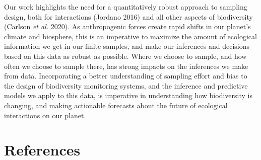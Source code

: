 \documentclass[10pt,oneside]{article}
\begin{document}
Our work highlights the need for a quantitatively robust approach to
sampling design, both for interactions (Jordano 2016) and all other
aspects of biodiversity (Carlson \emph{et al.} 2020). As anthropogenic
forces create rapid shifts in our planet's climate and biosphere, this
is an imperative to maximize the amount of ecological information we get
in our finite samples, and make our inferences and decisions based on
this data as robust as possible. Where we choose to sample, and how
often we choose to sample there, has strong impacts on the inferences we
make from data. Incorporating a better understanding of sampling effort
and bias to the design of biodiversity monitoring systems, and the
inference and predictive models we apply to this data, is imperative in
understanding how biodiversity is changing, and making actionable
forecasts about the future of ecological interactions on our planet.

\hypertarget{references}{%
\section*{References}\label{references}}
\end{document}
